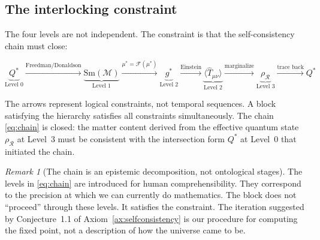 \documentclass[12pt,a4paper]{article}
\theoremstyle{definition}
\theoremstyle{remark}
\newtheorem{remark}{Remark}
\begin{document}
\subsection{The interlocking constraint}
\label{sec:interlock}

The four levels are not independent. The constraint is that the self-consistency
chain must close:

\begin{equation}
\underbrace{Q^*}_{\text{Level 0}}
\xrightarrow{\text{Freedman/Donaldson}}
\underbrace{\mathrm{Sm}(\mathcal{M})}_{\text{Level 1}}
\xrightarrow{\mu^* = \mathcal{F}(\mu^*)}
\underbrace{g^*}_{\text{Level 2}}
\xrightarrow{\text{Einstein}}
\underbrace{\langle\hat{T}_{\mu\nu}\rangle}_{\text{Level 2}}
\xrightarrow{\text{marginalize}}
\underbrace{\rho_\mathcal{R}}_{\text{Level 3}}
\xrightarrow{\text{trace back}}
Q^*
\label{eq:chain}
\end{equation}

The arrows represent logical constraints, not temporal sequences. A block
satisfying the hierarchy satisfies all constraints simultaneously. The chain
\eqref{eq:chain} is closed: the matter content derived from the effective
quantum state $\rho_\mathcal{R}$ at Level~3 must be consistent with the
intersection form $Q^*$ at Level~0 that initiated the chain.

\begin{remark}[The chain is an epistemic decomposition, not ontological stages]
The levels in \eqref{eq:chain} are introduced for human comprehensibility.
They correspond to the precision at which we can currently do mathematics. The
block does not ``proceed'' through these levels. It satisfies the constraint.
The iteration suggested by Conjecture~1.1 of Axiom~\ref{ax:selfconsistency}
is our procedure for computing the fixed point, not a description of how the
universe came to be.
\end{remark}
\end{document}
